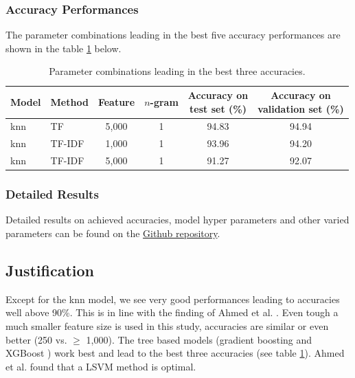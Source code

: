 \documentclass[a4paper,12pt,nottoc]{article}
\begin{document}
\subsubsection{Accuracy Performances}

The parameter combinations leading in the best five accuracy performances are shown in the table \ref{tab:accperf} below.

\begin{table}[h]
\begin{center}
\begin{tabular}{| l | l | c | c | c | c |}
\hline
Model & Method & Feature & $n$-gram & \thead{Accuracy on \\ test set (\%)} & \thead{Accuracy on \\ validation set (\%)} \\
\hline
knn & TF & 5,000 & 1 & 94.83 & 94.94 \\
knn & TF-IDF & 1,000 & 1 & 93.96 & 94.20 \\
knn & TF-IDF & 5,000 & 1 & 91.27 & 92.07	 \\
\hline 
\end{tabular}
\end{center}
\caption{Parameter combinations leading in the best three accuracies.}\label{tab:accperf}
\end{table}

\clearpage
\subsubsection{Detailed Results}

Detailed results on achieved accuracies, model hyper parameters and other varied parameters can be found on the \href{https://github.com/benjaminperucco/udacity-nano-mle/blob/master/5%20Capstone/2%20Project/3_postprocessing.ipynb}{Github repository}. 

\subsection{Justification}

Except for the knn model, we see very good performances leading to accuracies well above 90\%. This is in line with the finding of Ahmed et al. \cite{bib:ahmed-2017}. Even tough a much smaller feature size is used in this study, accuracies are similar or even better (250 vs. $\geq$ 1,000). The tree based models (gradient boosting \cite{bib:gbc} and XGBoost \cite{bib:xgb}) work best and lead to the best three accuracies (see table \ref{tab:accperf}). Ahmed et al. \cite{bib:ahmed-2017} found that a LSVM method is optimal.\\
\end{document}
